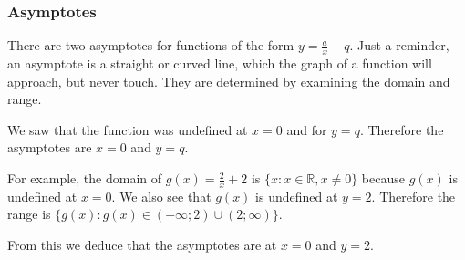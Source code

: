         \label{m39341*uid156}
            \subsubsection{ Asymptotes}
            \nopagebreak
          \label{m39341*id248536}There are two asymptotes for functions of the form $y=\frac{a}{x}+q$. Just a reminder, an asymptote is a straight or curved line, which the graph of a function will approach, but never touch. They are determined by examining the domain and range.\par 
          \label{m39341*id248567}We saw that the function was undefined at $x=0$ and for $y=q$. Therefore the asymptotes are $x=0$ and $y=q$.\par 
          \label{m39341*id248630}For example, the domain of $g\left(x\right)=\frac{2}{x}+2$ is $\{x:x\in \mathbb{R},x\ne 0\}$ because $g\left(x\right)$ is undefined at $x=0$. We also see that $g\left(x\right)$ is undefined at $y=2$. Therefore the range is $\{g\left(x\right):g\left(x\right)\in \left(-\infty ;2\right)\cup \left(2;\infty \right)\}$.\par 
          \label{m39341*id248820}From this we deduce that the asymptotes are at $x=0$ and $y=2$.\par 
        \label{m39341*uid157}
